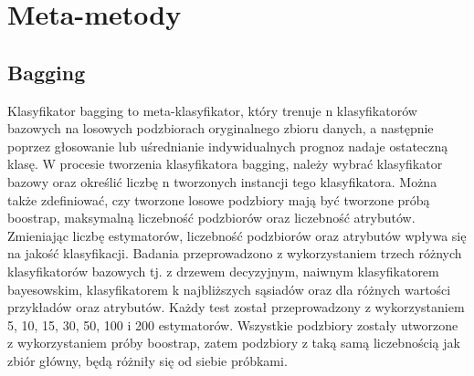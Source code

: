 \chapter{Meta-metody}
\section{Bagging}
Klasyfikator bagging to meta-klasyfikator, który trenuje n klasyfikatorów bazowych na losowych podzbiorach oryginalnego zbioru danych, a następnie poprzez głosowanie lub uśrednianie indywidualnych prognoz nadaje ostateczną klasę. W procesie tworzenia klasyfikatora bagging, należy wybrać klasyfikator bazowy oraz określić liczbę n tworzonych instancji tego klasyfikatora. Można także zdefiniować, czy tworzone losowe podzbiory mają być tworzone próbą boostrap, maksymalną liczebność podzbiorów oraz liczebność atrybutów. Zmieniając liczbę estymatorów, liczebność podzbiorów oraz atrybutów wpływa się na jakość klasyfikacji. Badania przeprowadzono z wykorzystaniem trzech różnych klasyfikatorów bazowych tj. z drzewem decyzyjnym, naiwnym klasyfikatorem bayesowskim, klasyfikatorem k najbliższych sąsiadów oraz dla różnych wartości przykładów oraz atrybutów. Każdy test został przeprowadzony z wykorzystaniem 5, 10, 15, 30, 50, 100 i 200 estymatorów. Wszystkie podzbiory zostały utworzone z wykorzystaniem próby boostrap, zatem podzbiory z taką samą liczebnością jak zbiór główny, będą różniły się od siebie próbkami.
  
